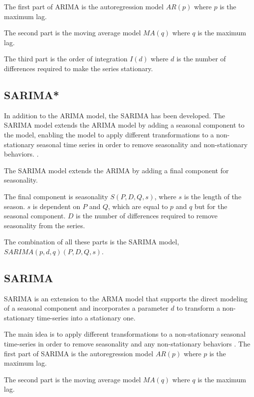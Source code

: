 The first part of ARIMA is the autoregression model
$AR(p)$ where $p$ is the maximum lag.

The second part is the moving average model $MA(q)$ where $q$ is the maximum lag.

The third part is the order of integration $I(d)$ where $d$ is the number of
differences required to make the series stationary.


\subsection{SARIMA*}
In addition to the ARIMA model, the SARIMA has been developed.
The SARIMA model extends the ARIMA model by adding a seasonal component to the model,
enabling the model to apply different transformations to a non-stationary seasonal time series in order to remove seasonality and non-stationary behaviors.
\citep[p. 327-385]{Utlaut2008}.

The SARIMA model extends the ARIMA by adding a final component for seasonality.

The final component is seasonality $S(P, D, Q, s)$, where $s$ is the length
of the season.
$s$ is dependent on $P$ and $Q$, which are equal to $p$ and $q$ but for the seasonal component.
$D$ is the number of differences required to remove seasonality from the series.

The combination of all these parts is the SARIMA model,
$SARIMA(p, d, q)(P, D, Q, s)$.




\iffalse
  \subsection{SARIMA}
  SARIMA is an extension to the ARMA model that supports the direct modeling of a seasonal component and incorporates a parameter $d$
  to transform a non-stationary time-series into a stationary one.

  The main idea is to apply different transformations to a non-stationary seasonal time-series
  in order to remove seasonality and any non-stationary behaviors
  \citep[p. 327-385]{Utlaut2008}.
  The first part of SARIMA is the autoregression model
  $AR(p)$ where $p$ is the maximum lag.

  The second part is the moving average model $MA(q)$ where $q$ is the maximum lag.

